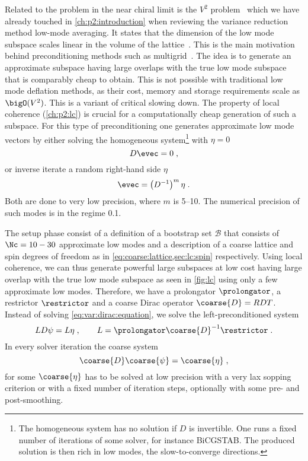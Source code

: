 Related to the problem in the near chiral limit is the $V^{2}$ problem~\cite{Luescher2007} which we have already touched in \cref{ch:p2:introduction} when reviewing the variance reduction method low-mode averaging.
It states that the dimension of the low mode subspace scales linear in the volume of the lattice~\cite{banks1980}.
This is the main motivation behind preconditioning methods such as multigrid~\cite{Babich:2010qb}.
The idea is to generate an approximate subspace having large overlaps with the true low mode subspace that is comparably cheap to obtain.
This is not possible with traditional low mode deflation methods, as their cost, memory and storage requirements scale as $\bigO(V^{2})$.
This is a variant of critical slowing down.
The property of local coherence (\cref{ch:p2:lc}) is crucial for a computationally cheap generation of such a subspace.
For this type of preconditioning one generates approximate low mode vectors by either solving the homogeneous system\footnote{The homogeneous system has no solution if $D$ is invertible. One runs a fixed number of iterations of some solver, for instance BiCGSTAB. The produced solution is then rich in low modes, \ie the slow-to-converge directions.} with $\eta=0$
\begin{equation}
D \evec = 0 \;,
\end{equation}{}
or inverse iterate a random right-hand side $\eta$
\begin{equation}
\evec = \left( D^{-1} \right)^{m} \eta \;.
\end{equation}
Both are done to very low precision, where $m$ is \numrange{5}{10}.
The numerical precision of such modes is in the regime \num{0.1}.

The setup phase consist of a definition of a bootstrap set $\mathcal{B}$ that consists of $\Nc = 10-30$ approximate low modes and a description of a coarse lattice and spin degrees of freedom as in \cref{eq:coarse:lattice,sec:lc:spin} respectively.
Using local coherence, we can thus generate powerful large subspaces at low cost having large overlap with the true low mode subspace as seen in \cref{fig:lc} using only a few approximate low modes.
Therefore, we have a prolongator $\prolongator$, a restrictor $\restrictor$ and a coarse Dirac operator $\coarse{D} = RDT$.
Instead of solving \cref{eq:var:dirac:equation}, we solve the left-preconditioned system
\begin{equation} \label{eq:var:dirac:equation:mg}
L D \psi = L \eta \;,
\qquad
L = \prolongator \coarse{D}^{-1} \restrictor \;.
\end{equation}
In every solver iteration the coarse system
\begin{equation} \label{eq:coarse:dirac:equation}
\coarse{D} \coarse{\psi} = \coarse{\eta} \;,
\end{equation}
for some $\coarse{\eta}$ has to be solved at low precision with a very lax sopping criterion or with a fixed number of iteration steps, optionally with some pre- and post-smoothing.

